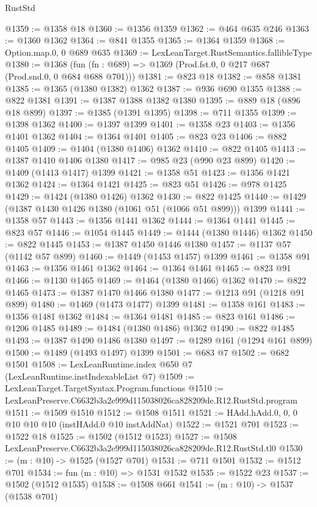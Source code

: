 \begin{lexlean}{RustStd}
\begin{coremodule}
@1359 := @1358 @18
@1360 := @1356 @1359
@1362 := @464 @635 @246
@1363 := @1360 @1362
@1364 := @841 @1355
@1365 := @1364 @1359
@1368 := Option.map.{0, 0} @689 @635
@1369 := LexLeanTarget.RustSemantics.fallibleType
@1380 := @1368
    (fun (fn : @689) => @1369 (Prod.fst.{0, 0} @217 @687 (Prod.snd.{0, 0} @684 @688 @701)))
@1381 := @823 @18
@1382 := @858 @1381
@1385 := @1365 (@1380 @1382) @1362
@1387 := @936 @690 @1355
@1388 := @822 @1381
@1391 := @1387 @1388 @1382 @1380
@1395 := @889 @18 (@896 @18 @899)
@1397 := @1385 (@1391 @1395)
@1398 := @711 @1355
@1399 := @1398 @1362
@1400 := @1397 @1399
@1401 := @1358 @23
@1403 := @1356 @1401 @1362
@1404 := @1364 @1401
@1405 := @823 @23
@1406 := @882 @1405
@1409 := @1404 (@1380 @1406) @1362
@1410 := @822 @1405
@1413 := @1387 @1410 @1406 @1380
@1417 := @985 @23 (@990 @23 @899)
@1420 := @1409 (@1413 @1417) @1399
@1421 := @1358 @51
@1423 := @1356 @1421 @1362
@1424 := @1364 @1421
@1425 := @823 @51
@1426 := @978 @1425
@1429 := @1424 (@1380 @1426) @1362
@1430 := @822 @1425
@1440 := @1429 (@1387 @1430 @1426 @1380 (@1061 @51 (@1066 @51 @899))) @1399
@1441 := @1358 @57
@1443 := @1356 @1441 @1362
@1444 := @1364 @1441
@1445 := @823 @57
@1446 := @1054 @1445
@1449 := @1444 (@1380 @1446) @1362
@1450 := @822 @1445
@1453 := @1387 @1450 @1446 @1380
@1457 := @1137 @57 (@1142 @57 @899)
@1460 := @1449 (@1453 @1457) @1399
@1461 := @1358 @91
@1463 := @1356 @1461 @1362
@1464 := @1364 @1461
@1465 := @823 @91
@1466 := @1130 @1465
@1469 := @1464 (@1380 @1466) @1362
@1470 := @822 @1465
@1473 := @1387 @1470 @1466 @1380
@1477 := @1213 @91 (@1218 @91 @899)
@1480 := @1469 (@1473 @1477) @1399
@1481 := @1358 @161
@1483 := @1356 @1481 @1362
@1484 := @1364 @1481
@1485 := @823 @161
@1486 := @1206 @1485
@1489 := @1484 (@1380 @1486) @1362
@1490 := @822 @1485
@1493 := @1387 @1490 @1486 @1380
@1497 := @1289 @161 (@1294 @161 @899)
@1500 := @1489 (@1493 @1497) @1399
@1501 := @683 @7
@1502 := @682 @1501
@1508 := LexLeanRuntime.index @650 @7 (LexLeanRuntime.instIndexableList @7)
@1509 := LexLeanTarget.TargetSyntax.Program.functions
@1510 := LexLeanPreserve.C6632b3a2e999d115038026ca828209de.R12.RustStd.program
@1511 := @1509 @1510
@1512 := @1508 @1511
@1521 := HAdd.hAdd.{0, 0, 0} @10 @10 @10 (instHAdd.{0} @10 instAddNat)
@1522 := @1521 @701
@1523 := @1522 @18
@1525 := @1502 (@1512 @1523)
@1527 := @1508 LexLeanPreserve.C6632b3a2e999d115038026ca828209de.R12.RustStd.tl0
@1530 := (m : @10) -> @1525 (@1527 @701)
@1531 := @711 @1501
@1532 := @1512 @701
@1534 := fun (m : @10) => @1531 @1532
@1535 := @1522 @23
@1537 := @1502 (@1512 @1535)
@1538 := @1508 @661
@1541 := (m : @10) -> @1537 (@1538 @701)

\end{coremodule}
\end{lexlean}
